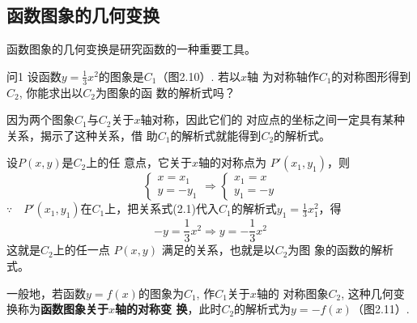 \subsection{函数图象的几何变换}
函数图象的几何变换是研究函数的一种重要工具。

\begin{thm}{问1}
设函数$y=\frac{1}{3}x^2$的图象是$C_1$（图2.10）. 若以$x$轴
为对称轴作$C_1$的对称图形得到$C_2$, 你能求出以$C_2$为图象的函
数的解析式吗？
\end{thm}

\begin{figure}[htp]
    \centering
{}
    \caption{}
\end{figure}

\begin{analyze}
    因为两个图象$C_1$与$C_2$关于$x$轴对称，因此它们的
对应点的坐标之间一定具有某种关系，揭示了这种关系，借
助$C_1$的解析式就能得到$C_2$的解析式。
\end{analyze}

设$P(x,y)$是$C_2$上的任
意点，它关于$x$轴的对称点为
$P'(x_1,y_1)$，则
\begin{equation}
\begin{cases}
    x=x_1\\
    y=-y_1
\end{cases}\Longrightarrow \begin{cases}
    x_1=x\\ y_1=-y
\end{cases}
\end{equation}
$\because\quad P'(x_1,y_1)$在$C_1$上，把关系式(2.1)代入$C_1$的解析式$y_1=\frac{1}{3}x^2_1$，得
\[-y=\frac{1}{3}x^2 \Longrightarrow y=-\frac{1}{3}x^2\]
这就是$C_2$上的任一点
$P(x,y)$
满足的关系，也就是以$C_2$为图
象的函数的解析式。

一般地，若函数$y=f(x)$的图象为$C_1$, 作$C_1$关于$x$轴的
对称图象$C_2$, 这种几何变换称为\textbf{函数图象关于$x$轴的对称变
换}，此时$C_2$的解析式为$y=-f(x)$（图2.11）.


